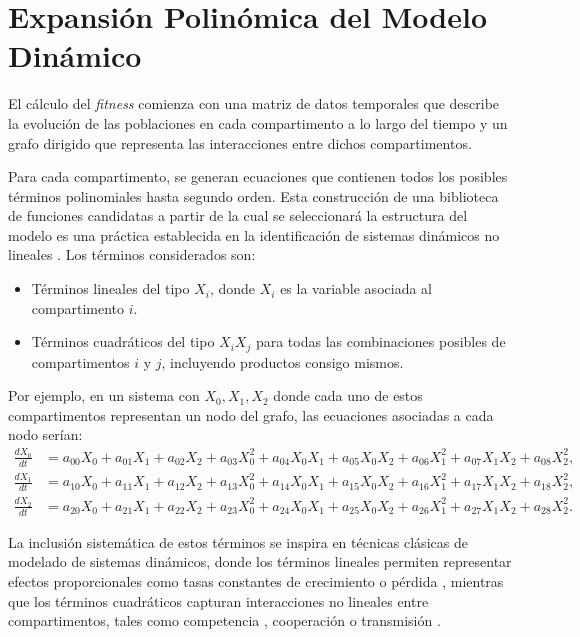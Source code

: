\section{Expansión Polinómica del Modelo Dinámico}
\label{sec:exp_pol}

El cálculo del \textit{fitness} comienza con una matriz de datos temporales que describe la evolución de las poblaciones 
en cada compartimento a lo largo del tiempo y un grafo dirigido que representa las interacciones entre dichos compartimentos. 

Para cada compartimento, se generan ecuaciones que contienen todos los posibles términos  polinomiales hasta segundo orden. Esta construcción de una biblioteca de 
funciones candidatas a partir de la cual se seleccionará la estructura del modelo es una práctica establecida en la identificación de sistemas dinámicos no lineales 
\cite{ljung1999, Billings2013}. Los términos considerados son:

\begin{itemize}
    \item Términos lineales del tipo $X_i$, donde $X_i$ es la variable asociada al compartimento $i$.
    \item Términos cuadráticos del tipo $X_i X_j$ para todas las combinaciones posibles de compartimentos $i$ y $j$, incluyendo productos consigo mismos.
\end{itemize}

Por ejemplo, en un sistema con \(X_0, X_1, X_2\) donde cada uno de estos compartimentos representan un nodo del grafo, las ecuaciones asociadas a cada nodo serían:
\begin{align*}
    \frac{dX_0}{dt} &= a_{00} X_0 + a_{01} X_1 + a_{02} X_2 + a_{03} X_0^2 + a_{04} X_0 X_1 + a_{05} X_0 X_2 + a_{06} X_1^2 + a_{07} X_1 X_2 + a_{08} X_2^2, \\
    \frac{dX_1}{dt} &= a_{10} X_0 + a_{11} X_1 + a_{12} X_2 + a_{13} X_0^2 + a_{14} X_0 X_1 + a_{15} X_0 X_2 + a_{16} X_1^2 + a_{17} X_1 X_2 + a_{18} X_2^2, \\
    \frac{dX_2}{dt} &= a_{20} X_0 + a_{21} X_1 + a_{22} X_2 + a_{23} X_0^2 + a_{24} X_0 X_1 + a_{25} X_0 X_2 + a_{26} X_1^2 + a_{27} X_1 X_2 + a_{28} X_2^2.
\end{align*}

La inclusión sistemática de estos términos se inspira en técnicas clásicas de modelado de sistemas dinámicos, donde los términos lineales permiten representar 
efectos proporcionales como tasas constantes de crecimiento o pérdida \cite{strogatz2018nonlinear}, mientras que los términos cuadráticos capturan interacciones 
no lineales entre compartimentos, tales como competencia \cite{murray2002mathematical}, cooperación o transmisión \cite{anderson1992infectious}. 

